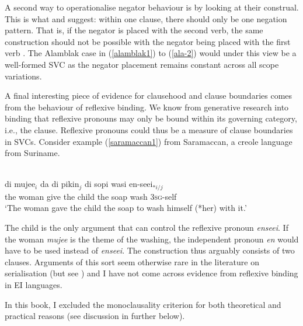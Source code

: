 A second way to operationalise negator behaviour is by looking at their construal. This is what \citet{haspelmath2016serial} and  \citet{bohnemeyer2007principles} suggest: within one clause, there should only be one negation pattern. That is, if the negator is placed with the second verb, the same construction should not be possible with the negator being placed with the first verb \citep{haspelmath2016serial}. The Alamblak case in (\ref{alamblak1}) to (\ref{ala-2}) would under this view be a well-formed SVC as the negator placement remains constant across all scope variations.

A final interesting piece of evidence for clausehood and clause boundaries comes from the behaviour of reflexive binding. We know from generative research into binding that reflexive pronouns may only be bound within its governing category, i.e., the clause. Reflexive pronouns could thus be a measure of clause boundaries in SVCs. Consider example (\ref{saramaccan1}) from Saramaccan, a creole language from Suriname.

\ea \label{saramaccan1}
\\
\gll di mujee$_i$ da di pikin$_j$ di sopi wasi en-seei$_{*i/j}$ \\
the woman give the child the soap wash \textsc{3}\textsc{sg}-self \\
\glft `The woman gave the child the soap to wash himself (*her) with it.'\\ 
\z

The child is the only argument that can control the reflexive pronoun \textit{enseei}. If the woman \textit{mujee} is the theme of the washing, the independent pronoun \textit{en} would have to be used instead of \textit{enseei}. The construction thus arguably consists of two clauses. Arguments of this sort seem otherwise rare in the literature on serialisation (but see \citealt[514]{baker1989object}) and I have not come across evidence from reflexive binding in EI languages. 

In this book, I excluded the monoclausality criterion for both theoretical and practical reasons (see discussion in  further below).

